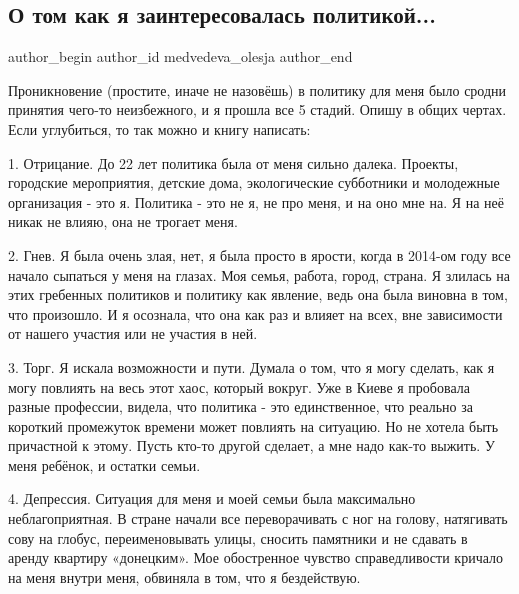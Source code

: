  
 
 
 
 
\subsection{О том как я заинтересовалась политикой...}
\label{sec:20_11_2021.tg.medvedeva_olesja.1.politika_interes}

\ifcmt
 author_begin
   author_id medvedeva_olesja
 author_end
\fi

Проникновение (простите, иначе не назовёшь) в политику для меня было сродни
принятия чего-то неизбежного, и я прошла все 5 стадий. Опишу в общих чертах.
Если углубиться, то так можно и книгу написать:

1. Отрицание. До 22 лет политика была от меня сильно далека. Проекты, городские
мероприятия, детские дома, экологические субботники и молодежные организация -
это я. Политика - это не я, не про меня, и на оно мне на. Я на неё никак не
влияю, она не трогает меня. 

2. Гнев. Я была очень злая, нет, я была просто в ярости, когда в 2014-ом году
все начало сыпаться у меня на глазах. Моя семья, работа, город, страна. Я
злилась на этих гребенных политиков и политику как явление, ведь она была
виновна в том, что произошло. И я осознала, что она как раз и влияет на всех,
вне зависимости от нашего участия или не участия в ней.

3. Торг. Я искала возможности и пути. Думала о том, что я могу сделать, как я
могу повлиять на весь этот хаос, который вокруг. Уже в Киеве я пробовала разные
профессии, видела, что политика - это единственное, что реально за короткий
промежуток времени может повлиять на ситуацию. Но не хотела быть причастной к
этому. Пусть кто-то другой сделает, а мне надо как-то выжить. У меня ребёнок, и
остатки семьи.

4. Депрессия. Ситуация для меня и моей семьи была максимально неблагоприятная.
В стране начали все переворачивать с ног на голову, натягивать сову на глобус,
переименовывать улицы, сносить памятники и не сдавать в аренду квартиру
«донецким». Мое обостренное чувство справедливости кричало на меня внутри меня,
обвиняла в том, что я бездействую.

